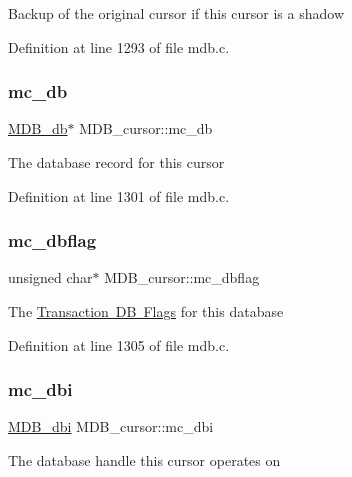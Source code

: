 Backup of the original cursor if this cursor is a shadow 

Definition at line 1293 of file mdb.\+c.

\mbox{\label{struct_m_d_b__cursor_a607ef0e65f7f18bbc0842dfd66e9ea73}} 
\subsubsection{\texorpdfstring{mc\+\_\+db}{mc\_db}}
{\footnotesize\ttfamily \mbox{\hyperlink{struct_m_d_b__db}{M\+D\+B\+\_\+db}}$\ast$ M\+D\+B\+\_\+cursor\+::mc\+\_\+db}

The database record for this cursor 

Definition at line 1301 of file mdb.\+c.

\mbox{\label{struct_m_d_b__cursor_a45bf21bcb00312d52c46f0b3b21e6858}} 
\subsubsection{\texorpdfstring{mc\+\_\+dbflag}{mc\_dbflag}}
{\footnotesize\ttfamily unsigned char$\ast$ M\+D\+B\+\_\+cursor\+::mc\+\_\+dbflag}

The \mbox{\hyperlink{group__mt__dbflag}{Transaction DB Flags}} for this database 

Definition at line 1305 of file mdb.\+c.

\mbox{\label{struct_m_d_b__cursor_a44eb2040bafbb4f0824ab42e36ffce50}} 
\subsubsection{\texorpdfstring{mc\+\_\+dbi}{mc\_dbi}}
{\footnotesize\ttfamily \mbox{\hyperlink{group__mdb_gadbe68a06c448dfb62da16443d251a78b}{M\+D\+B\+\_\+dbi}} M\+D\+B\+\_\+cursor\+::mc\+\_\+dbi}

The database handle this cursor operates on 

